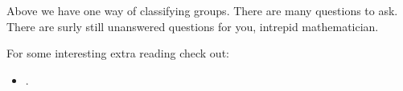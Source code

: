 \documentclass{ximera}
\begin{document}
Above we have one way of classifying groups. There are many questions
to ask. There are surly still unanswered questions for you, intrepid
mathematician.


For some interesting extra reading check out:
\begin{itemize}
\item {}.
\end{itemize}
\end{document}
